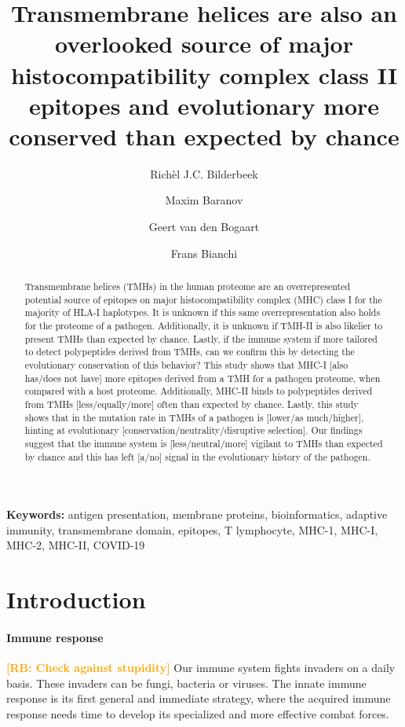 \documentclass{article}
\title{
  Transmembrane helices are also 
  an overlooked source of major histocompatibility complex class II epitopes
  and evolutionary more conserved than expected by chance
}
\author[1]{Richèl J.C. Bilderbeek}
\author[1]{Maxim Baranov}
\author[1]{Geert van den Bogaart}
\author[1]{Frans Bianchi}
\affil[1]{GBB, University of 
Groningen, Groningen, The Netherlands}
\newcommand{\richel}[1]{\textcolor{orange}{\textbf{[RB: #1]}}}
\begin{document}
\maketitle

\begin{abstract}

Transmembrane helices (TMHs) in the human proteome
are an overrepresented potential source of epitopes on major 
histocompatibility complex (MHC) class I for the majority of HLA-I haplotypes. 
It is unknown if this same overrepresentation
also holds for the proteome of a pathogen.
Additionally, it is unknown if TMH-II is also likelier to present
TMHs than expected by chance. 
Lastly, if the immune system if more tailored to detect polypeptides
derived from TMHs, can we confirm this by detecting the evolutionary
conservation of this behavior?
This study shows that MHC-I [also has/does not have] more
epitopes derived from a TMH for a pathogen proteome, when compared with
a host proteome.
Additionally, MHC-II binds to polypeptides derived from TMHs 
[less/equally/more] often than expected by chance.
Lastly, this study shows that in the mutation rate in TMHs of a pathogen
is [lower/as much/higher], hinting at 
evolutionary [conservation/neutrality/disruptive selection].
Our findings suggest that the immune system is [less/neutral/more]
vigilant to TMHs than expected by chance and this has left [a/no]
signal in the evolutionary history of the pathogen.

\end{abstract}

{\bf Keywords:} antigen presentation, membrane proteins, bioinformatics, 
adaptive immunity, transmembrane domain, epitopes, T lymphocyte, 
MHC-1, MHC-I, MHC-2, MHC-II, COVID-19

\section{Introduction}

\paragraph{Immune response}

\richel{Check against stupidity}
Our immune system fights invaders on a daily basis.
These invaders can be fungi, bacteria or viruses.
The innate immune response is its first general 
and immediate strategy, where the acquired immune response
needs time to develop its specialized and more effective
combat forces.
\end{document}
